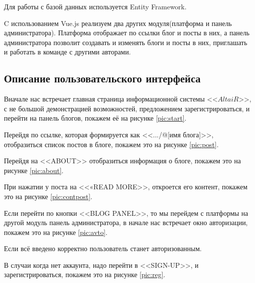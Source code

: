 Для работы с базой данных используется Entity Framework.

C использованием Vue.js реализуем два других модуля(платформа и панель администратора). Платформа отображает по ссылки блог и посты в них, а панель администратора позволит создавать и изменять блоги и посты в них, приглашать и работать в команде с другими авторами. 

\pagebreak
\subsection{Описание пользовательского интерфейса}

Вначале нас встречает главная страница информационной системы <<$AltaiR$>>, с не большой демонстрацией возможностей, предложением зарегистрироваться, и перейти на панель блогов, покажем её на рисунке \ref{pic:start}.


Перейдя по ссылке, которая формируется как <<.../@[имя блога]>>, отобразиться список постов в блоге, покажем это на рисунке \ref{pic:post}.


\pagebreak
Перейдя на <<ABOUT>> отобразиться информация о блоге, покажем это на рисунке \ref{pic:about}.


При нажатии у поста на <<«READ MORE>>, откроется его контент, покажем это на рисунке \ref{pic:contpost}.


\pagebreak
Если перейти по кнопки <<BLOG PANEL>>, то мы перейдем с платформы на другой модуль панель администратора, в начале нас встречает окно авторизации, покажем это на рисунке \ref{pic:avto}.


Если всё введено корректно пользователь станет авторизованным.

\pagebreak
В случаи когда нет аккаунта, надо перейти в <<SIGN-UP>>, и зарегистрироваться, покажем это на рисунке \ref{pic:reg}.


    

\pagebreak
